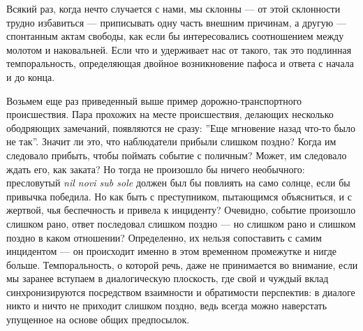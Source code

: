 \documentclass[12pt]{book}
\begin{document}
Всякий раз, когда нечто случается с нами, мы склонны --- от этой склонности трудно избавиться --- приписывать одну часть внешним причинам, а другую --- спонтанным актам свободы, как если бы интересовались соотношением между молотом и наковальней. Если что и удерживает нас от такого, так это подлинная темпоральность, определяющая двойное возникновение пафоса и ответа с начала и до конца.

Возьмем еще раз приведенный выше пример дорожно-транспортного происшествия. Пара прохожих на месте происшествия, делающих несколько ободряющих замечаний, появляются не сразу: ''Еще мгновение назад что-то было не так''. Значит ли это, что наблюдатели прибыли слишком поздно? Когда им следовало прибыть, чтобы поймать событие с поличным? Может, им следовало ждать его, как заката? Но тогда не произошло бы ничего необычного: пресловутый \textit{nil novi sub sole} должен был бы повлиять на само солнце, если бы привычка победила. Но как быть с преступником, пытающимся объясниться, и с жертвой, чья беспечность и привела к инциденту? Очевидно, событие произошло слишком рано, ответ последовал слишком поздно --- но слишком рано и слишком поздно в каком отношении? Определенно, их нельзя сопоставить с самим инцидентом --- он происходит именно в этом временном промежутке и нигде больше. Темпоральность, о которой речь, даже не принимается во внимание, если мы заранее вступаем в диалогическую плоскость, где свой и чуждый вклад синхронизируются посредством взаимности и обратимости перспектив: в диалоге никто и ничто не приходит слишком поздно, ведь всегда можно наверстать упущенное на основе общих предпосылок.
\end{document}
